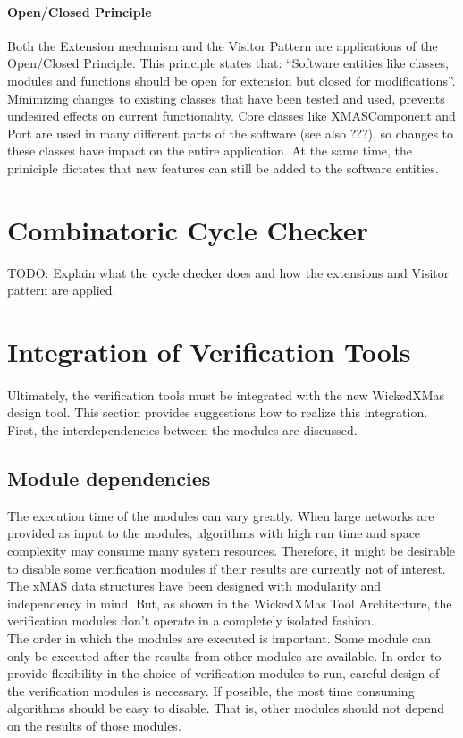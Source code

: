 \documentclass[a4paper,11pt]{article}
\begin{document}
\paragraph{Open/Closed Principle}
Both the Extension mechanism and the Visitor Pattern are applications of the Open/Closed
Principle. This principle states that: ``Software entities like classes, modules and functions
should be open for extension but closed for modifications''\cite{oodesign-open-close}. Minimizing
changes to existing classes that have been tested and used, prevents undesired effects
on current functionality. Core classes like XMASComponent and Port are used in many different parts
of the software (see also ???), so changes to these classes have impact on the entire application.
At the same time, the priniciple dictates that new features can still be added to the software entities.


\section{Combinatoric Cycle Checker}

TODO: Explain what the cycle checker does and how the extensions and Visitor pattern are applied.


\section{Integration of Verification Tools}

\paragraph{}
Ultimately, the verification tools must be integrated with the new WickedXMas design tool.
This section provides suggestions how to realize this integration. First, the
interdependencies between the modules are discussed.


\subsection{Module dependencies}

The execution time of the modules can vary greatly. When large networks are provided as input to the
modules, algorithms with high run time and space complexity may consume many system resources. Therefore,
it might be desirable to disable some verification modules if their results are currently not of interest.\\
The xMAS data structures have been designed with modularity and independency in mind. But, as shown in
the WickedXMas Tool Architecture, the verification modules don't operate in a completely isolated
fashion.\\
The order in which the modules are executed is important. Some module can only be executed after
the results from other modules are available. In order to provide flexibility in the choice of
verification modules to run, careful design of the verification modules is necessary.
If possible, the most time consuming algorithms should be easy to disable. That is, other modules
should not depend on the results of those modules.
\end{document}
